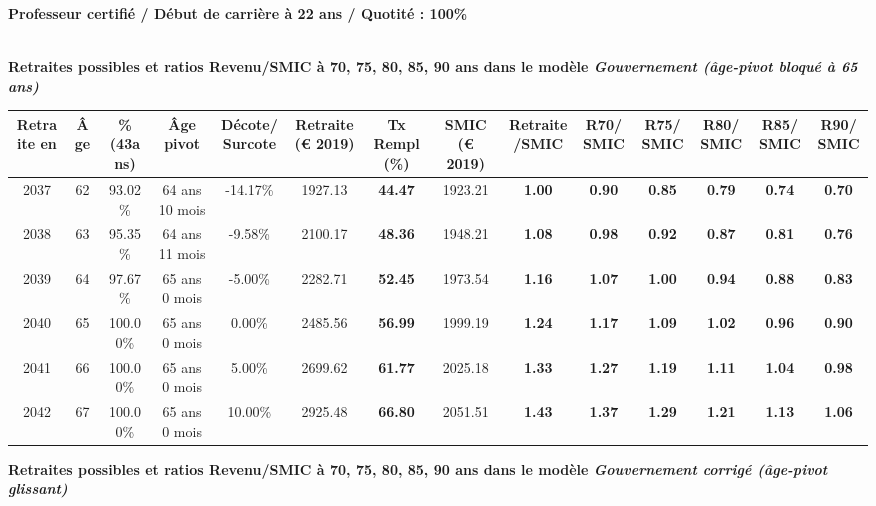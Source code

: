 {\bf \noindent Professeur certifié / Début de carrière à 22 ans / Quotité : 100\%}  ~ 

 ~\\{\bf \noindent Retraites possibles et ratios Revenu/SMIC à 70, 75, 80, 85, 90 ans dans le modèle \emph{Gouvernement (âge-pivot bloqué à 65 ans)}}  
 
\begin{adjustbox}{max width=\textwidth} 
\begin{tabular}[htb]{|c|c||c|c|c||c|c||c|c||c|c|c|c|c|} 
\hline 
 Retraite en &  Âge &  \%(43ans) &  Âge pivot &  Décote/Surcote &  Retraite (\euro{} 2019) &  Tx Rempl(\%) &  SMIC (\euro{} 2019) &  Retraite/SMIC &  R70/SMIC &  R75/SMIC &  R80/SMIC &  R85/SMIC &  R90/SMIC \\ 
\hline \hline 
 2037 &  62 &  93.02\% &  64 ans 10 mois &  -14.17\% &  1927.13 &  {\bf 44.47} &  1923.21 &  {\bf 1.00} &  {\bf {\color{red} 0.90}} &  {\bf {\color{red} 0.85}} &  {\bf {\color{red} 0.79}} &  {\bf {\color{red} 0.74}} &  {\bf {\color{red} 0.70}} \\ 
\hline 
 2038 &  63 &  95.35\% &  64 ans 11 mois &  -9.58\% &  2100.17 &  {\bf 48.36} &  1948.21 &  {\bf 1.08} &  {\bf {\color{red} 0.98}} &  {\bf {\color{red} 0.92}} &  {\bf {\color{red} 0.87}} &  {\bf {\color{red} 0.81}} &  {\bf {\color{red} 0.76}} \\ 
\hline 
 2039 &  64 &  97.67\% &  65 ans 0 mois &  -5.00\% &  2282.71 &  {\bf 52.45} &  1973.54 &  {\bf 1.16} &  {\bf 1.07} &  {\bf 1.00} &  {\bf {\color{red} 0.94}} &  {\bf {\color{red} 0.88}} &  {\bf {\color{red} 0.83}} \\ 
\hline 
 2040 &  65 &  100.00\% &  65 ans 0 mois &  0.00\% &  2485.56 &  {\bf 56.99} &  1999.19 &  {\bf 1.24} &  {\bf 1.17} &  {\bf 1.09} &  {\bf 1.02} &  {\bf {\color{red} 0.96}} &  {\bf {\color{red} 0.90}} \\ 
\hline 
 2041 &  66 &  100.00\% &  65 ans 0 mois &  5.00\% &  2699.62 &  {\bf 61.77} &  2025.18 &  {\bf 1.33} &  {\bf 1.27} &  {\bf 1.19} &  {\bf 1.11} &  {\bf 1.04} &  {\bf {\color{red} 0.98}} \\ 
\hline 
 2042 &  67 &  100.00\% &  65 ans 0 mois &  10.00\% &  2925.48 &  {\bf 66.80} &  2051.51 &  {\bf 1.43} &  {\bf 1.37} &  {\bf 1.29} &  {\bf 1.21} &  {\bf 1.13} &  {\bf 1.06} \\ 
\hline 
\hline 
\end{tabular} 
\end{adjustbox} 
 
 \vspace{0.1cm} 
{\bf \noindent Retraites possibles et ratios Revenu/SMIC à 70, 75, 80, 85, 90 ans dans le modèle \emph{Gouvernement corrigé (âge-pivot glissant)}}  
 
